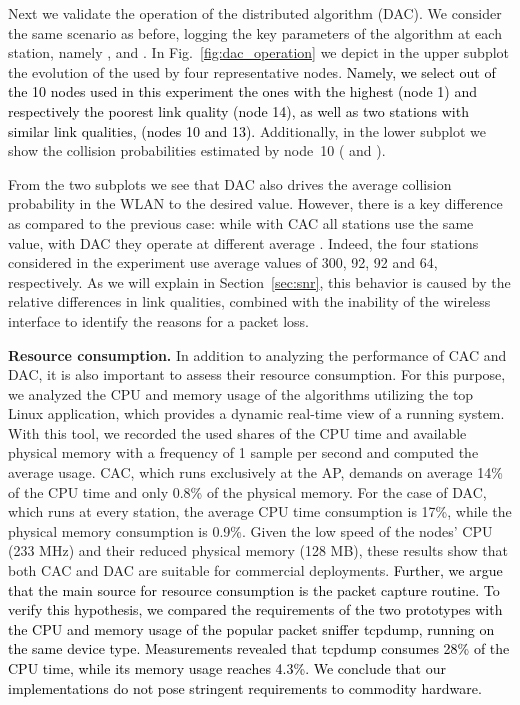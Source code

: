 \documentclass[a4paper,10pt]{article}
\newcommand{\revs}[1]{\textcolor{black}{#1}}
\begin{document}
Next we validate the operation of the distributed algorithm (DAC). We consider the same scenario as before, logging the key parameters of the algorithm at each station, namely ,  and . In Fig.~\ref{fig:dac_operation} we depict in the upper subplot the evolution of the  used by four representative nodes. \revs{Namely, we select out of the 10 nodes used in this experiment the ones with the highest (node 1) and respectively the poorest link quality (node 14), as well as two stations with similar link qualities, (nodes 10 and 13).} Additionally, in the lower subplot we show the collision probabilities estimated by node~10 ( and ). 

From the two subplots we see that DAC also drives the average collision probability in the WLAN to the desired value. However, there is a key difference as compared to the previous case: while with CAC all stations use the same  value, with DAC they operate at different average . Indeed, the four stations considered in the experiment use average  values of 300, 92, 92 and 64, respectively. As we will explain in Section~\ref{sec:snr}, this behavior is caused by the relative differences in link qualities, combined with the inability of the wireless interface to identify the reasons for a packet loss.

\vspace{0.25em}
{\bf Resource consumption.} In addition to analyzing the performance of CAC and DAC, it is also important to assess their resource consumption. For this purpose, we analyzed the CPU and memory usage of the algorithms utilizing the {\ttfamily top} Linux application, which provides a dynamic real-time view of a running system. With this tool, we recorded the used shares of the CPU time and available physical memory with a frequency of 1 sample per second and computed the average usage. CAC, which runs exclusively at the AP, demands on average 14\% of the CPU time and only 0.8\% of the physical memory. For the case of DAC, which runs at every station, the average CPU time consumption is 17\%, while the physical memory consumption is 0.9\%. Given the low speed of the nodes' CPU (233 MHz) and their reduced physical memory (128 MB), these results show that both CAC and DAC are suitable for commercial deployments. \revs{Further, we argue that the main source for resource consumption is the packet capture routine. To verify this hypothesis, we compared the requirements of the two prototypes with the CPU and memory usage of the popular packet sniffer {\ttfamily tcpdump}, running on the same device type. Measurements revealed that {\ttfamily tcpdump} consumes 28\% of the CPU time, while its memory usage reaches 4.3\%. We conclude that our implementations do not pose stringent requirements to commodity hardware.}
\end{document}
